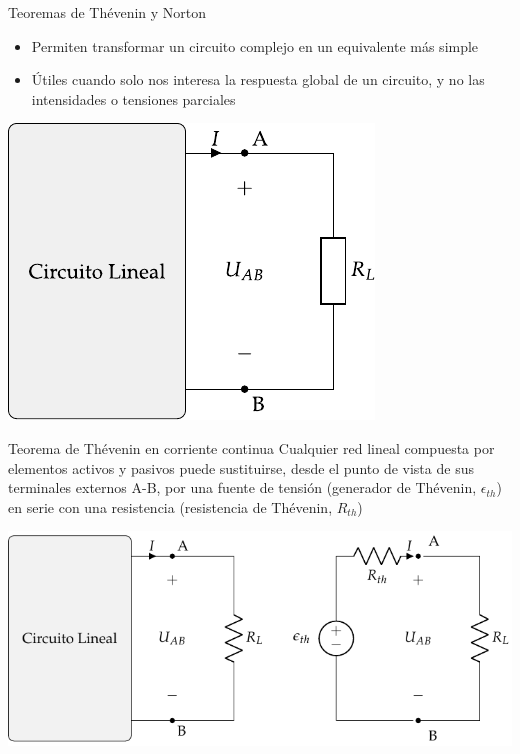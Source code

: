 \documentclass[aspectratio=169, xcolor={usenames,svgnames,dvipsnames}]{beamer}
\begin{document}
\begin{frame}{Teoremas de Thévenin y Norton}

    \vspace{2mm}
    \begin{itemize}
        \item Permiten transformar un circuito complejo en un equivalente \alert{más simple}

        \vspace{2mm}
        \item Útiles cuando solo nos interesa la \alert{respuesta global de un circuito}, y no las intensidades o tensiones parciales        
    \end{itemize}

    \vspace{1mm}
    \begin{center}
    \includegraphics[width=.4\linewidth]{../figs/thevenin_continua_red.pdf}
    \end{center}
\end{frame}


\begin{frame}{Teorema de Thévenin en corriente continua}
    \vspace{3mm}
    Cualquier \alert{red lineal} compuesta por elementos activos y pasivos \alert{puede sustituirse}, desde el punto de vista de sus terminales externos A-B, por una \alert{fuente de tensión} (generador de Thévenin, \(\epsilon_{th}\)) en \alert{serie} con una \alert{resistencia} (resistencia de Thévenin, \(R_{th}\))

    \vspace{2mm}
    \begin{center}
        \includegraphics[height=0.6\textheight]{../figs/EquivalenteThevenin_R.pdf}
    \end{center}
\end{frame}
\end{document}
